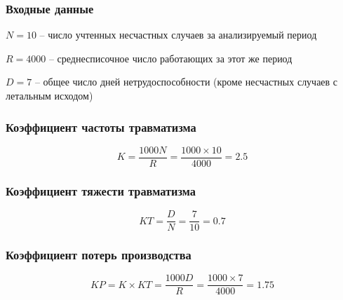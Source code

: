 \documentclass[a5paper, 12dd, twoside]{article}
\begin{document}
\subsubsection*{Входные данные}
\(N = 10\) -- число учтенных несчастных случаев за анализируемый период

\(R = 4000\) -- среднесписочное число работающих за этот же период

\(D = 7\) -- общее число дней нетрудоспособности (кроме несчастных случаев с летальным исходом)

\subsubsection*{Коэффициент частоты травматизма}
\[K = \frac{1000N}{R} = \frac{1000 \times 10}{4000} = 2.5\]
\subsubsection*{Коэффициент тяжести травматизма}
\[KT = \frac{D}{N} = \frac{7}{10} = 0.7\]
\subsubsection*{Коэффициент потерь производства}
\[KP = K \times KT = \frac{1000 D}{R} = \frac{1000 \times 7}{4000} = 1.75\]

\end{document}
